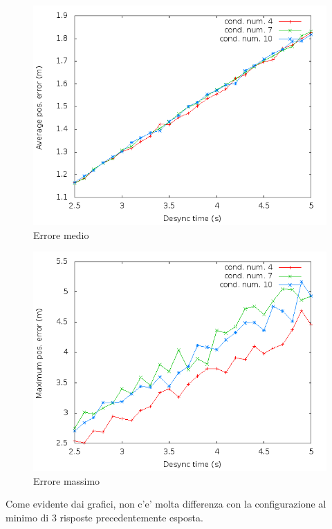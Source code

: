 \documentclass[Lau,binding=0.6cm]{sapthesis}
\begin{document}
\begin{figure}[H]
    \centering
    \includegraphics[scale=0.5]{octagonsimulation/avposerrorreq4preempt1drop1speed1.png}
    \caption{Errore medio}
    \label{fig:octagonsimulation/avposerrorreq4preempt1drop1speed1}
\end{figure}
\begin{figure}[H]
    \centering
    \includegraphics[scale=0.5]{octagonsimulation/maxposerrorreq4preempt1drop1speed1.png}
    \caption{Errore massimo}
    \label{fig:octagonsimulation/avposerrorreq4preempt1drop1speed1}
\end{figure}
Come evidente dai grafici, non c'e' molta differenza con la configurazione al minimo di 3 risposte precedentemente esposta.
\end{document}
